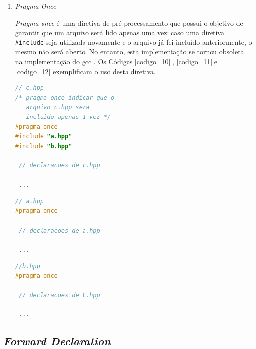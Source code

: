 \begin{enumerate}
\item \textit{Pragma Once}

\textit{Pragma once} é uma diretiva de pré-processamento que possui o objetivo de
 garantir que um arquivo será lido apenas uma vez: caso uma diretiva 
\texttt{\#include} seja utilizada novamente e o arquivo já foi incluído anteriormente,
 o mesmo não será aberto. No entanto, esta implementação se tornou obsoleta 
 na implementação do gcc \cite{gcc-pragma_once}. Os Códigos \ref{codigo_10} 
, \ref{codigo_11} e \ref{codigo_12} exemplificam o uso desta diretiva.



\begin{lstlisting}[language=C++,caption={
                Arquivo c.hpp com guarda de inclusão \texttt{\#pragma once}},
                                                            label=codigo_10]
// c.hpp
/* pragma once indicar que o 
   arquivo c.hpp sera
   incluido apenas 1 vez */
#pragma once            
#include "a.hpp"
#include "b.hpp"

 // declaracoes de c.hpp

 ...

\end{lstlisting}

\begin{lstlisting}[language=C++,caption={
               Arquivo a.hpp com guarda de inclusão \texttt{\#pragma once}},
                                                            label=codigo_11]
// a.hpp
#pragma once 

 // declaracoes de a.hpp

 ...

\end{lstlisting}

\begin{lstlisting}[language=C++,caption={ 
              Arquivo b.hpp com guarda de inclusão \texttt{ \#pragma once}},
                                                            label=codigo_12]
//b.hpp
#pragma once 

 // declaracoes de b.hpp

 ...

\end{lstlisting}

\end{enumerate}

\subsection{\textit{Forward Declaration}}\label{forward_declaration_section}

